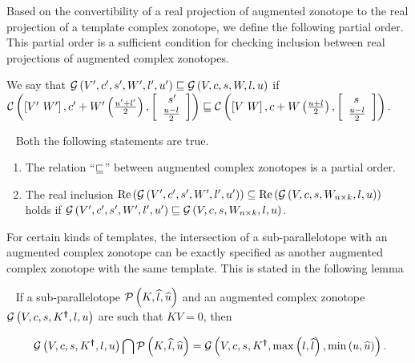 Based on the convertibility of a real projection of augmented zonotope
to the real projection of a template complex zonotope, we define the
following partial order.  This partial order is a sufficient condition
for checking inclusion between real projections of augmented complex
zonotopes.

\begin{definition}
We say that $\mathcal{G}\left(V^\prime,c^\prime,s^\prime,W^\prime,l^\prime,u^\prime\right)\sqsubseteq
\mathcal{G}\left(V,c,s,W,l,u\right)$ if\\ $\mathcal{C}\left(\left[V^\prime~W^\prime\right],c^\prime+W^\prime\left(\frac{u^\prime+l^\prime}{2}\right),\left[\begin{array}{l}{\hspace{0.5em}s^\prime}\\{\frac{u-l}{2}} \end{array}\right]\right)
\sqsubseteq
\mathcal{C}\left(\left[V~W\right],c+W\left(\frac{u+l}{2}\right),\left[\begin{array}{l}{\hspace{0.5em}s}\\{\frac{u-l}{2}} \end{array}\right]\right).$
\end{definition}

\begin{lemma}~\label{lem:gcz-gcz} Both the following statements are
  true.
\begin{enumerate}
\item The relation ``$\sqsubseteq$'' between augmented complex zonotopes is
  a partial order.
\item The real inclusion
$\operatorname{\operatorname{Re}}\left(\mathcal{G}\left(V^\prime,c^\prime,s^\prime,W^\prime,l^\prime,u^\prime\right)\right)\subseteq
\operatorname{\operatorname{Re}}\left(\mathcal{G}\left(V,c,s,W_{n\times k},l,u\right)\right)$ holds if $\mathcal{G}\left(V^\prime,c^\prime,s^\prime,W^\prime,l^\prime,u^\prime\right)\sqsubseteq \mathcal{G}\left(V,c,s,W_{n\times k},l,u\right)$.
\end{enumerate}
\end{lemma}

For certain kinds of templates, the intersection of a
sub-parallelotope with an augmented complex zonotope can be exactly
specified as another augmented complex zonotope with the same
template.  This is stated in the following lemma 
\begin{lemma}~\label{lem:intersection} If a sub-parallelotope
  $\mathcal{P}\left(K,\widehat{l},\widehat{u}\right)$ and an augmented complex zonotope
  $\mathcal{G}\left(V,c,s,K^{\bm{\dagger}},l,u\right)$ are such that $KV=0$, then
  
\begin{equation}~\label{eqn:intersection}
\mathcal{G}\left(V,c,s,K^{\bm{\dagger}},l,u\right)\bigcap \mathcal{P}\left(K,\widehat{l},\widehat{u}\right) =
  \mathcal{G}\left(V,c,s,K^{\bm{\dagger}},\max\left(l,\widehat{l}\right),\min\left(u,\widehat{u}\right)\right).
\end{equation}
\end{lemma}

